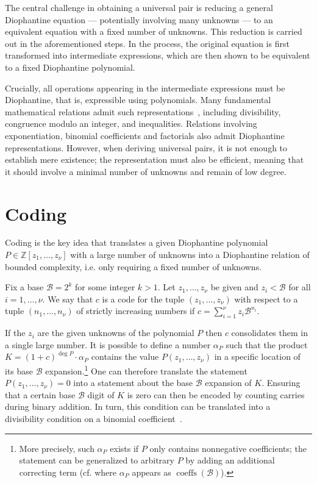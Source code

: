 \documentclass[a4paper,USenglish,cleveref,autoref,thm-restate]{lipics-v2021}
\newcommand{\Z}{{\mathbb Z}}
\newcommand{\B}{\mathscr{B}}
\DeclareMathOperator{\coeffs}{coeffs}
\begin{document}
The central challenge in obtaining a universal pair is reducing a general Diophantine equation --- potentially involving many unknowns --- to an equivalent equation with a fixed number of unknowns. This reduction is carried out in the aforementioned steps. In the process, the original equation is first transformed into intermediate expressions, which are then shown to be equivalent to a fixed Diophantine polynomial.

Crucially, all operations appearing in the intermediate expressions must be Diophantine, that is, expressible using polynomials. Many fundamental mathematical relations admit such representations~\cite{matiyasevich-book}, including divisibility, congruence modulo an integer, and inequalities. Relations involving exponentiation, binomial coefficients and factorials also admit Diophantine representations. However, when deriving universal pairs, it is not enough to establish mere existence; the representation must also be efficient, meaning that it should involve a minimal number of unknowns and remain of low degree.

\begin{figure}[omitted: a diagram of this paper's results, not reproduced here]\label{fig:proof-structure}\end{figure}

\section{Coding}
Coding is the key idea that translates a given Diophantine polynomial $P \in \Z[z_1, \ldots, z_\nu]$ with a large number of unknowns into a Diophantine relation of bounded complexity, i.e. only requiring a fixed number of unknowns.

\begin{definition}[Code] \label{def:code}
Fix a base $\B = 2^k$ for some integer $k > 1$. Let $z_1, \ldots, z_\nu$ be given and $z_i < \B$ for all $i=1, \ldots, \nu$. We say that $c$ is a code for the tuple $(z_1, \ldots, z_\nu)$ with respect to a tuple $(n_1, \ldots, n_\nu)$ of strictly increasing numbers if $c = \sum_{i=1}^\nu z_i \B^{n_i}$.
\end{definition}

If the $z_i$ are the given unknowns of the polynomial $P$ then $c$ consolidates them in a single large number. It is possible to define a number $\alpha_P$ such that the product $K = (1 + c)^{\deg P} \cdot \alpha_P$ contains the value $P(z_1, \ldots, z_\nu)$ in a specific location of its base $\B$ expansion.\footnote{More precisely, such $\alpha_P$ exists if $P$ only contains nonnegative coefficients; the statement can be generalized to arbitrary $P$ by adding an additional correcting term (cf. \cite[Lemma 1.8]{manuscript} where $\alpha_P$ appears as $\coeffs(\B)$).} One can therefore translate the statement $P(z_1, \ldots, z_\nu) = 0$ into a statement about the base $\B$ expansion of $K$. Ensuring that a certain base $\B$ digit of $K$ is zero can then be encoded by counting carries during binary addition. In turn, this condition can be translated into a divisibility condition on a binomial coefficient~\cite[Lemmas~1.3 and~1.4]{manuscript}. 
\end{document}
